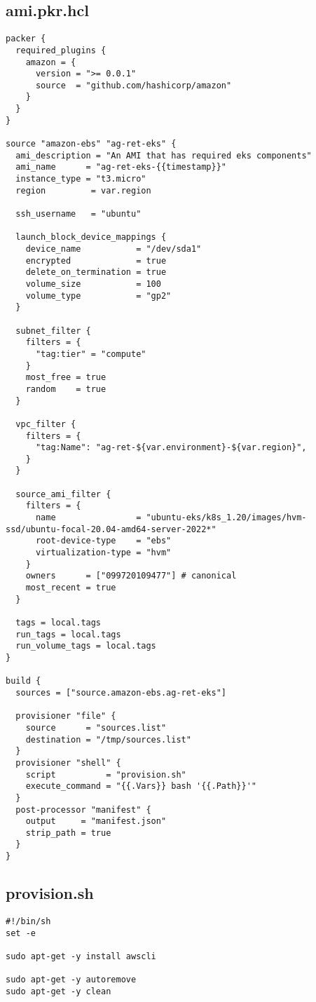 \subsection*{ami.pkr.hcl}
\begin{verbatim}
packer {
  required_plugins {
    amazon = {
      version = ">= 0.0.1"
      source  = "github.com/hashicorp/amazon"
    }
  }
}

source "amazon-ebs" "ag-ret-eks" {
  ami_description = "An AMI that has required eks components"
  ami_name      = "ag-ret-eks-{{timestamp}}"
  instance_type = "t3.micro"
  region         = var.region

  ssh_username   = "ubuntu"

  launch_block_device_mappings {
    device_name           = "/dev/sda1"
    encrypted             = true
    delete_on_termination = true
    volume_size           = 100
    volume_type           = "gp2"
  }
  
  subnet_filter {
    filters = {
      "tag:tier" = "compute"
    }
    most_free = true
    random    = true
  }
  
  vpc_filter {
    filters = {
      "tag:Name": "ag-ret-${var.environment}-${var.region}",
    }
  }

  source_ami_filter {
    filters = {
      name                = "ubuntu-eks/k8s_1.20/images/hvm-ssd/ubuntu-focal-20.04-amd64-server-2022*"
      root-device-type    = "ebs"
      virtualization-type = "hvm"
    }
    owners      = ["099720109477"] # canonical
    most_recent = true
  }
  
  tags = local.tags
  run_tags = local.tags
  run_volume_tags = local.tags
}

build {
  sources = ["source.amazon-ebs.ag-ret-eks"]

  provisioner "file" {
    source      = "sources.list"
    destination = "/tmp/sources.list"
  }
  provisioner "shell" {
    script          = "provision.sh"
    execute_command = "{{.Vars}} bash '{{.Path}}'"
  }
  post-processor "manifest" {
    output     = "manifest.json"
    strip_path = true
  }
}

\end{verbatim}

\subsection*{provision.sh}
\begin{verbatim}
#!/bin/sh
set -e

sudo apt-get -y install awscli

sudo apt-get -y autoremove
sudo apt-get -y clean
\end{verbatim}